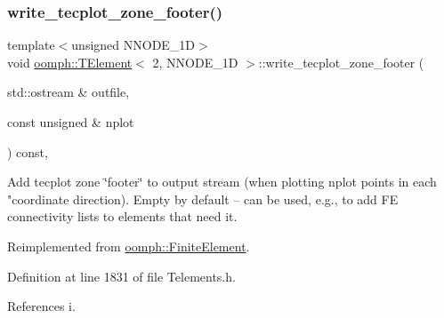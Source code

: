 \mbox{\label{classoomph_1_1TElement_3_012_00_01NNODE__1D_01_4_a1bc5afa4920836278400df77012cb1c3}} 
\subsubsection{\texorpdfstring{write\+\_\+tecplot\+\_\+zone\+\_\+footer()}{write\_tecplot\_zone\_footer()}\hspace{0.1cm}{\footnotesize\ttfamily [1/2]}}
{\footnotesize\ttfamily template$<$unsigned N\+N\+O\+D\+E\+\_\+1D$>$ \\
void \hyperlink{classoomph_1_1TElement}{oomph\+::\+T\+Element}$<$ 2, N\+N\+O\+D\+E\+\_\+1D $>$\+::write\+\_\+tecplot\+\_\+zone\+\_\+footer (\begin{DoxyParamCaption}\item[{std\+::ostream \&}]{outfile,  }\item[{const unsigned \&}]{nplot }\end{DoxyParamCaption}) const\hspace{0.3cm}{\ttfamily [inline]}, {\ttfamily [virtual]}}



Add tecplot zone \char`\"{}footer\char`\"{} to output stream (when plotting nplot points in each "coordinate direction). Empty by default -- can be used, e.\+g., to add FE connectivity lists to elements that need it. 



Reimplemented from \hyperlink{classoomph_1_1FiniteElement_ac3987a5ead7dc20c63d86b333466e2b5}{oomph\+::\+Finite\+Element}.



Definition at line 1831 of file Telements.\+h.



References i.

\mbox{\label{classoomph_1_1TElement_3_012_00_01NNODE__1D_01_4_ae1fbb81a92bd1966ae7653afbe7eb593}} 
